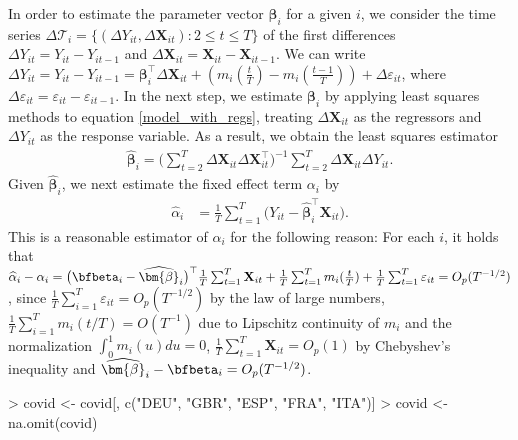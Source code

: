 \documentclass[a4paper]{article}
\begin{document}
In order to estimate the parameter vector $\bm{\beta}_i$ for a given $i$, we consider the time series $\Delta \mathcal{T}_i = \{(\Delta Y_{it}, \Delta \mathbf{X}_{it}): 2 \leq t \leq T\}$ of the first differences $\Delta Y_{it} = Y_{it} - Y_{i t-1}$ and $\Delta  \mathbf{X}_{it} =  \mathbf{X}_{it} - \mathbf{X}_{it-1}$. We can write $\Delta Y_{it} = Y_{it} - Y_{i t-1} =\bm{\beta}_i^\top \Delta \mathbf{X}_{it} + (m_i (\frac{t}{T}) - m_i (\frac{t-1}{T})) + \Delta \varepsilon_{it}$, where $ \Delta \varepsilon_{it} = \varepsilon_{it} - \varepsilon_{i t-1}$. In the next step, we estimate $\bm{\beta}_i$ by applying least squares methods to equation \eqref{model_with_regs}, treating $\Delta \mathbf{X}_{it}$ as the regressors and $\Delta Y_{it}$ as the response variable. As a result, we obtain the least squares estimator
\begin{align}\label{eq:beta:est}
\widehat{\bm{\beta}}_i = \Big( \sum_{t=2}^T \Delta \mathbf{X}_{it} \Delta \mathbf{X}_{it}^\top \Big)^{-1} \sum_{t=2}^T \Delta \mathbf{X}_{it} \Delta Y_{it}.
\end{align} Given $\widehat{\bm{\beta}}_i$, we next estimate the fixed effect term $\alpha_i$ by 
\begin{align}\label{eq:alpha:est}
\widehat{\alpha}_i &= \frac{1}{T}\sum_{t=1}^T \big(Y_{it} - \widehat{\bm{\beta}}_i^\top \mathbf{X}_{it}\big). 
\end{align}
This is a reasonable estimator of $\alpha_i$ for the following reason: For each $i$, it holds that
$\widehat{\alpha}_i - \alpha_i = \big(\bfbeta_i - \widehat{\bm{\beta}}_i \big)^\top\frac{1}{T}\sum_{t=1}^T  \mathbf{X}_{it} + \frac{1}{T}\sum_{t=1}^T m_i(\frac{t}{T}) + \frac{1}{T}\sum_{t=1}^T \varepsilon_{it} = O_p(T^{-1/2})$, 
since $\frac{1}{T}\sum_{i=1}^T \varepsilon_{it} = O_p(T^{-1/2})$ by the law of large numbers, $\frac{1}{T}\sum_{i=1}^T m_i(t/T) = O(T^{-1})$ due to Lipschitz continuity of $m_i$ and the normalization $\int_{0}^1 m_i(u)du = 0$, $\frac{1}{T}\sum_{t=1}^T  \mathbf{X}_{it} = O_p(1)$ by Chebyshev's inequality and $\widehat{\bm{\beta}}_i - \bfbeta_i = O_p (T^{-1/2})$. 


\begin{Schunk}
\begin{Sinput}
> covid <- covid[, c("DEU", "GBR", "ESP", "FRA", "ITA")]
> covid <- na.omit(covid)
\end{Sinput}
\end{Schunk}
\end{document}
